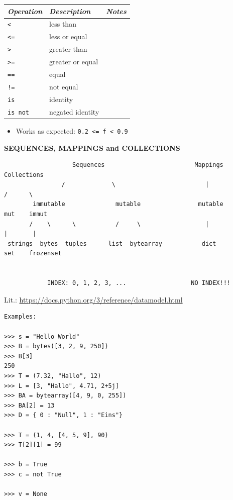 \documentclass[9pt,a4wide]{extarticle}
\begin{document}
\medskip

\begin{supertabular}{|l|p{12cm}|c|}\hline
{\em Operation}      & {\em Description}        &  {\em Notes} \\ \hline\hline

{\tt < }                   & less than                &        \\ \hline
{\tt <=}                   & less or equal            &        \\ \hline
{\tt > }                   & greater than             &        \\ \hline
{\tt >=}                   & greater or equal         &        \\ \hline
{\tt ==}                   & equal                    &        \\ \hline
{\tt !=}                   & not equal                &        \\ \hline
{\tt is}                   & identity                 &        \\ \hline
{\tt is not}               & negated identity         &        \\ \hline
\end{supertabular}

\medskip

\begin{itemize}
\item Works as expected: {\tt 0.2 <= f < 0.9}
\end{itemize}




\bigskip
{\LARGE\bf SEQUENCES, MAPPINGS and COLLECTIONS}
{}

\begin{verbatim}
                   Sequences                         Mappings         Collections 
                /             \                         |               /      \
        immutable              mutable                mutable          mut    immut
       /    \      \           /     \                  |               |       |
 strings  bytes  tuples      list  bytearray           dict            set    frozenset


            INDEX: 0, 1, 2, 3, ...                  NO INDEX!!!
\end{verbatim}


Lit.: \url{https://docs.python.org/3/reference/datamodel.html}


\begin{verbatim}
Examples:

>>> s = "Hello World"
>>> B = bytes([3, 2, 9, 250])
>>> B[3]
250
>>> T = (7.32, "Hallo", 12)
>>> L = [3, "Hallo", 4.71, 2+5j]
>>> BA = bytearray([4, 9, 0, 255])
>>> BA[2] = 13
>>> D = { 0 : "Null", 1 : "Eins"}

>>> T = (1, 4, [4, 5, 9], 90)
>>> T[2][1] = 99

>>> b = True
>>> c = not True

>>> v = None
\end{verbatim}
\end{document}
